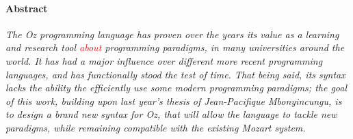 
\paragraph{Abstract}
\textit{
The Oz programming language has proven over the years its value as a learning and research tool \textcolor{red}{about} programming paradigms, in many universities around the world.
It has had a major influence over different more recent programming languages, and has functionally stood the test of time.
That being said, its syntax lacks the ability the efficiently use some modern programming paradigms;
the goal of this work, building upon last year's thesis of Jean-Pacifique Mbonyincungu, is to design a brand new syntax for Oz, that will allow the language to tackle new paradigms, while remaining compatible with the existing Mozart system.
}